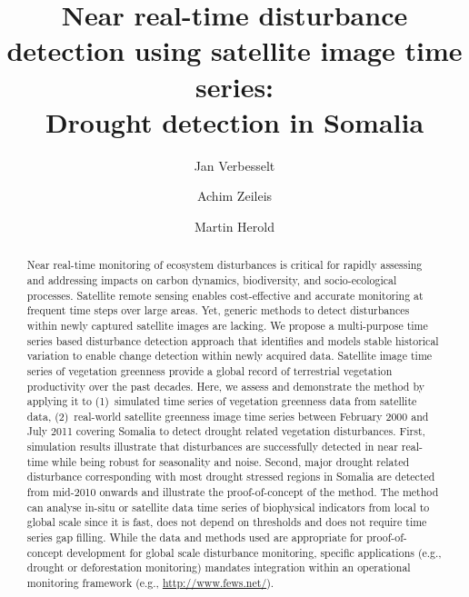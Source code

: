 \documentclass[authoryear,preprint,review,10pt]{elsarticle}
\begin{document}

\begin{frontmatter}

    \title
    {
Near real-time disturbance detection using satellite image time series: \\ Drought detection in Somalia
    }
    \author[WUR]{Jan Verbesselt}
    \author[UIBK]{Achim Zeileis}
    \author[WUR]{Martin Herold}
    \address[WUR]{Remote Sensing Team, Wageningen University, \\
           Droevendaalsesteeg 3, Wageningen 6708 PB, The Netherlands \\
           \emph{Ph}: + 31 317 48 52 68; \emph{Fax}: +31 317 419000}
    \address[UIBK]{Department of Statistics, Universit\"at Innsbruck, \\
           Universit\"atsstr.~15, 6020 Innsbruck, Austria}

\begin{abstract}
Near real-time monitoring of ecosystem disturbances is critical for rapidly assessing and addressing impacts on carbon dynamics, biodiversity, and socio-ecological processes. Satellite remote sensing enables cost-effective and accurate monitoring at frequent time steps over large areas. Yet, generic methods to detect disturbances within newly captured satellite images are lacking. 
We propose a multi-purpose time series based disturbance detection approach that identifies and models stable historical variation to enable change detection within newly acquired data.
Satellite image time series of vegetation greenness provide a global record of terrestrial vegetation productivity over the past decades. Here, we assess and demonstrate the method by applying it to (1)~simulated time series of vegetation greenness data from satellite data, (2)~real-world satellite greenness image time series between February 2000 and July 2011 covering Somalia to  detect drought related vegetation disturbances.
First, simulation results illustrate that disturbances are successfully detected in near real-time while being robust for seasonality and noise. Second, major drought related disturbance corresponding with most drought stressed regions in Somalia are detected from mid-2010 onwards and illustrate the proof-of-concept of the method. The method can analyse in-situ or satellite data time series of biophysical indicators from local to global scale since it is fast, does not depend on thresholds and does not require time series gap filling. While the data and methods used are appropriate for proof-of-concept development for global scale disturbance monitoring, specific applications (e.g., drought or deforestation monitoring) mandates integration within an operational monitoring framework (e.g., \url{http://www.fews.net/}).
\end{abstract}



\end{frontmatter}
\end{document}
